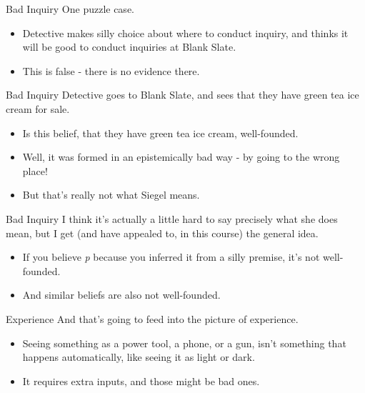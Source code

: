 \documentclass[
  17pt,
  letterpaper,
  ignorenonframetext,
  aspectratio=169,
  xcolor={dvipsnames}]{beamer}
\providecommand{\tightlist}{%
  \setlength{\itemsep}{0pt}\setlength{\parskip}{0pt}}\usepackage{longtable,booktabs,array}
\begin{document}
\begin{frame}{Bad Inquiry}
\protect\hypertarget{bad-inquiry}{}
One puzzle case.

\begin{itemize}[<+->]
\tightlist
\item
  Detective makes silly choice about where to conduct inquiry, and
  thinks it will be good to conduct inquiries at Blank Slate.
\item
  This is false - there is no evidence there.
\end{itemize}
\end{frame}

\begin{frame}{Bad Inquiry}
\protect\hypertarget{bad-inquiry-1}{}
Detective goes to Blank Slate, and sees that they have green tea ice
cream for sale.

\begin{itemize}[<+->]
\tightlist
\item
  Is this belief, that they have green tea ice cream, well-founded.
\item
  Well, it was formed in an epistemically bad way - by going to the
  wrong place!
\item
  But that's really not what Siegel means.
\end{itemize}
\end{frame}

\begin{frame}{Bad Inquiry}
\protect\hypertarget{bad-inquiry-2}{}
I think it's actually a little hard to say precisely what she does mean,
but I get (and have appealed to, in this course) the general idea.

\begin{itemize}[<+->]
\tightlist
\item
  If you believe \emph{p} because you inferred it from a silly premise,
  it's not well-founded.
\item
  And similar beliefs are also not well-founded.
\end{itemize}
\end{frame}

\begin{frame}{Experience}
\protect\hypertarget{experience-1}{}
And that's going to feed into the picture of experience.

\begin{itemize}[<+->]
\tightlist
\item
  Seeing something as a power tool, a phone, or a gun, isn't something
  that happens automatically, like seeing it as light or dark.
\item
  It requires extra inputs, and those might be bad ones.
\end{itemize}
\end{frame}
\end{document}
